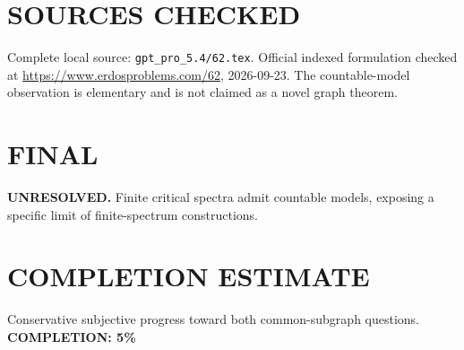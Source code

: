 \section{SOURCES CHECKED}
Complete local source: \texttt{gpt\_pro\_5.4/62.tex}. Official indexed formulation checked at \url{https://www.erdosproblems.com/62}, 2026-09-23. The countable-model observation is elementary and is not claimed as a novel graph theorem.
\section{FINAL}
\textbf{UNRESOLVED.} Finite critical spectra admit countable models, exposing a specific limit of finite-spectrum constructions.
\section{COMPLETION ESTIMATE}
Conservative subjective progress toward both common-subgraph questions.
\textbf{COMPLETION: 5\%}
